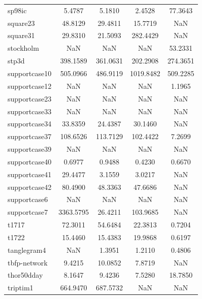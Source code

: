 \begin{longtable}{lcccc}
sp98ic                      &    5.4787 &   5.1810 &    2.4528 &   77.3643 \\
square23                    &   48.8129 &  29.4811 &   15.7719 &       NaN \\
square31                    &   29.8310 &  21.5093 &  282.4429 &       NaN \\
stockholm                   &       NaN &      NaN &       NaN &   53.2331 \\
stp3d                       &  398.1589 & 361.0631 &  202.2908 &  274.3651 \\
supportcase10               &  505.0966 & 486.9119 & 1019.8482 &  509.2285 \\
supportcase12               &       NaN &      NaN &       NaN &    1.1965 \\
supportcase23               &       NaN &      NaN &       NaN &       NaN \\
supportcase33               &       NaN &      NaN &       NaN &       NaN \\
supportcase34               &   33.8359 &  24.4387 &   30.1460 &       NaN \\
supportcase37               &  108.6526 & 113.7129 &  102.4422 &    7.2699 \\
supportcase39               &       NaN &      NaN &       NaN &       NaN \\
supportcase40               &    0.6977 &   0.9488 &    0.4230 &    0.6670 \\
supportcase41               &   29.4477 &   3.1559 &    3.0217 &       NaN \\
supportcase42               &   80.4900 &  48.3363 &   47.6686 &       NaN \\
supportcase6                &       NaN &      NaN &       NaN &       NaN \\
supportcase7                & 3363.5795 &  26.4211 &  103.9685 &       NaN \\
t1717                       &   72.3011 &  54.6484 &   22.3813 &    0.7204 \\
t1722                       &   15.4460 &  15.4383 &   19.9868 &    0.6197 \\
tanglegram4                 &       NaN &   1.3951 &    1.2110 &    0.4806 \\
tbfp-network                &    9.4215 &  10.0852 &    7.8719 &       NaN \\
thor50dday                  &    8.1647 &   9.4236 &    7.5280 &   18.7850 \\
triptim1                    &  664.9470 & 687.5732 &       NaN &       NaN \\

\end{longtable}
